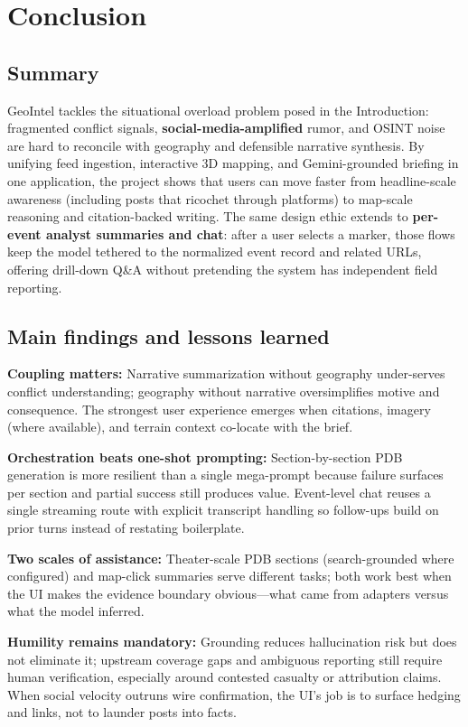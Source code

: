 \section{Conclusion}

\subsection{Summary}

GeoIntel tackles the situational overload problem posed in the Introduction: fragmented conflict signals, \textbf{social-media-amplified} rumor, and OSINT noise are hard to reconcile with geography and defensible narrative synthesis. By unifying feed ingestion, interactive 3D mapping, and Gemini-grounded briefing in one application, the project shows that users can move faster from headline-scale awareness (including posts that ricochet through platforms) to map-scale reasoning and citation-backed writing. The same design ethic extends to \textbf{per-event analyst summaries and chat}: after a user selects a marker, those flows keep the model tethered to the normalized event record and related URLs, offering drill-down Q\&A without pretending the system has independent field reporting.

\subsection{Main findings and lessons learned}

\textbf{Coupling matters:} Narrative summarization without geography under-serves conflict understanding; geography without narrative oversimplifies motive and consequence. The strongest user experience emerges when citations, imagery (where available), and terrain context co-locate with the brief.

\textbf{Orchestration beats one-shot prompting:} Section-by-section PDB generation is more resilient than a single mega-prompt because failure surfaces per section and partial success still produces value. Event-level chat reuses a single streaming route with explicit transcript handling so follow-ups build on prior turns instead of restating boilerplate.

\textbf{Two scales of assistance:} Theater-scale PDB sections (search-grounded where configured) and map-click summaries serve different tasks; both work best when the UI makes the evidence boundary obvious---what came from adapters versus what the model inferred.

\textbf{Humility remains mandatory:} Grounding reduces hallucination risk but does not eliminate it; upstream coverage gaps and ambiguous reporting still require human verification, especially around contested casualty or attribution claims. When social velocity outruns wire confirmation, the UI's job is to surface hedging and links, not to launder posts into facts.

